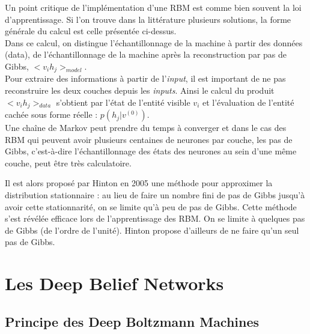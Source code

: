 \documentclass[a4paper,oneside]{report}
\begin{document}
                Un point critique de l'implémentation d'une RBM est comme bien souvent la loi 
d'apprentissage.
                Si l'on trouve dans la littérature plusieurs solutions, la forme générale du calcul 
est celle présentée ci-dessus.\\

Dans ce calcul, on distingue l'échantillonnage de la machine à partir des données 
(data), de l'échantillonnage de la machine après la reconstruction par pas de Gibbs, 
\begin{math}<v_{i}h_{j}>_{model}\end{math}.\\
                
                Pour extraire des informations à partir de l'\textit{input}, il est important de ne 
pas reconstruire les deux couches depuis les \textit{inputs}.
                Ainsi le calcul du produit \begin{math}<v_{i}h_{j}>_{data}\end{math} s'obtient par 
l'état de l'entité visible \begin{math}v_{i}\end{math} et l'évaluation de l'entité 
cachée sous forme réelle 
: \begin{math}p(h_{j}|v^{(0)})\end{math}.\\

Une chaîne de Markov peut prendre du temps à converger et dans le cas des RBM qui peuvent 
avoir plusieurs centaines de neurones par couche, les pas de Gibbs, c'est-à-dire l'échantillonnage
 des états des neurones au sein d'une même couche, peut être très calculatoire. 

Il est alors proposé par 
Hinton en 2005 une méthode pour approximer la distribution stationnaire : au lieu de faire un nombre
 fini de pas de Gibbs jusqu'à avoir cette stationnarité, on se limite qu'à peu de pas de Gibbs. Cette 
méthode s'est révélée efficace lors de l'apprentissage des RBM. On se limite à quelques pas de Gibbs (de l'ordre de l'unité).
Hinton propose d'ailleurs de ne faire qu'un seul pas de Gibbs.
				

        \chapter{Les Deep Belief Networks}

\section{Principe des Deep Boltzmann Machines}
\end{document}
